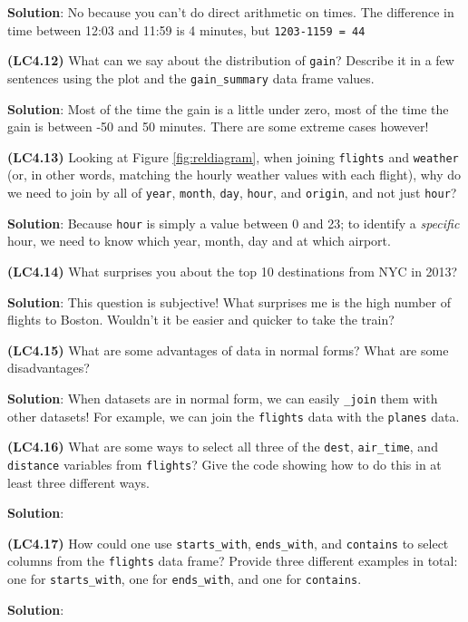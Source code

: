 \documentclass[12pt, krantz2,]{krantz}
\begin{document}
\textbf{Solution}: No because you can't do direct arithmetic on times. The difference in time between 12:03 and 11:59 is 4 minutes, but \texttt{1203-1159\ =\ 44}

\textbf{(LC4.12)} What can we say about the distribution of \texttt{gain}? Describe it in a few sentences using the plot and the \texttt{gain\_summary} data frame values.

\textbf{Solution}: Most of the time the gain is a little under zero, most of the time the gain is between -50 and 50 minutes. There are some extreme cases however!

\textbf{(LC4.13)} Looking at Figure \ref{fig:reldiagram}, when joining \texttt{flights} and \texttt{weather} (or, in other words, matching the hourly weather values with each flight), why do we need to join by all of \texttt{year}, \texttt{month}, \texttt{day}, \texttt{hour}, and \texttt{origin}, and not just \texttt{hour}?

\textbf{Solution}: Because \texttt{hour} is simply a value between 0 and 23; to identify a \emph{specific} hour, we need to know which year, month, day and at which airport.

\textbf{(LC4.14)} What surprises you about the top 10 destinations from NYC in 2013?

\textbf{Solution}: This question is subjective! What surprises me is the high number of flights to Boston. Wouldn't it be easier and quicker to take the train?

\textbf{(LC4.15)} What are some advantages of data in normal forms? What are some disadvantages?

\textbf{Solution}: When datasets are in normal form, we can easily \texttt{\_join} them with other datasets! For example, we can join the \texttt{flights} data with the \texttt{planes} data.

\textbf{(LC4.16)} What are some ways to select all three of the \texttt{dest}, \texttt{air\_time}, and \texttt{distance} variables from \texttt{flights}? Give the code showing how to do this in at least three different ways.

\textbf{Solution}:

\textbf{(LC4.17)} How could one use \texttt{starts\_with}, \texttt{ends\_with}, and \texttt{contains} to select columns from the \texttt{flights} data frame? Provide three different examples in total: one for \texttt{starts\_with}, one for \texttt{ends\_with}, and one for \texttt{contains}.

\textbf{Solution}:
\end{document}
